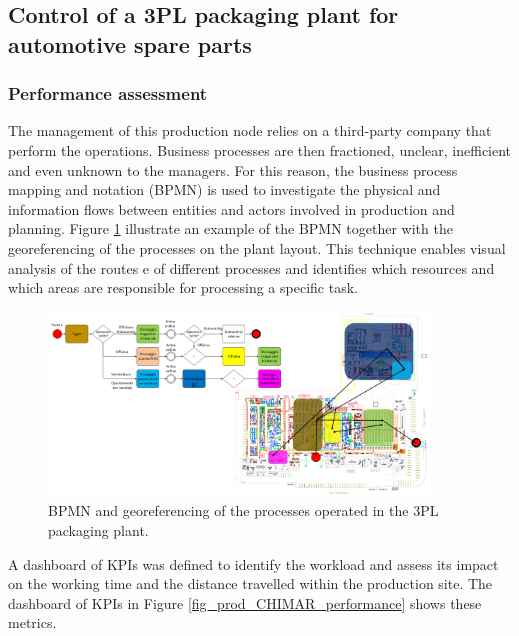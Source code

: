 \subsection{Control of a 3PL packaging plant for automotive spare parts} \label{secControlPackagingPlant}
\subsubsection{Performance assessment}

The management of this production node relies on a third-party company that perform the operations. Business processes are then fractioned, unclear, inefficient and even unknown to the managers. For this reason, the business process mapping and notation (BPMN)  is used to investigate the physical and information flows between entities and actors involved in production and planning. Figure \ref{fig_prod_CHIMAR_bpmn} illustrate an example of the BPMN together with the georeferencing of the processes on the plant layout. This technique enables visual analysis of the routes e of different processes and identifies which resources and which areas are responsible for processing a specific task. 

\begin{figure}[hbt!]
\centering
\includegraphics[width=0.9\textwidth]{sectionProduction/control_figures/fig_prod_CHIMAR_bpmn.png}
\captionsetup{type=figure}
\caption{BPMN and georeferencing of the processes operated in the 3PL packaging plant.}
\label{fig_prod_CHIMAR_bpmn}
\end{figure}

A dashboard of KPIs was defined to identify the workload and assess its impact on the working time and the distance travelled within the production site. The dashboard of KPIs in Figure \ref{fig_prod_CHIMAR_performance} shows these metrics.

